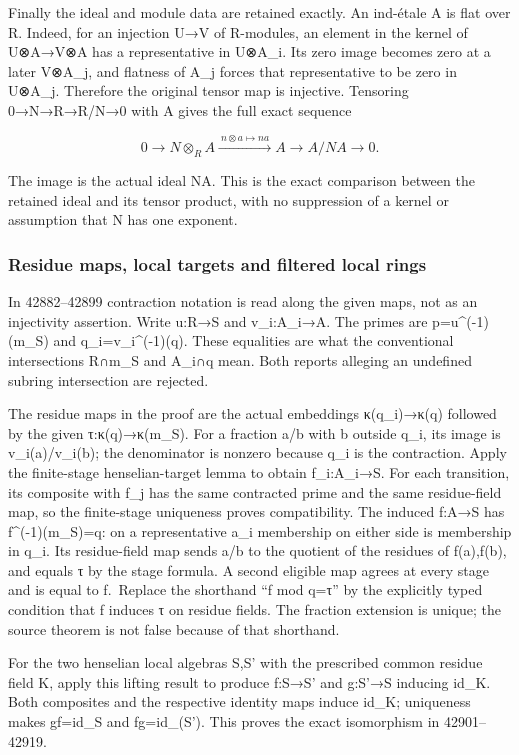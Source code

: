 Finally the ideal and module data are retained exactly. An ind-étale A is flat over R. Indeed, for an injection U→V of R-modules, an element in the kernel of U⊗A→V⊗A has a representative in U⊗A\_i. Its zero image becomes zero at a later V⊗A\_j, and flatness of A\_j forces that representative to be zero in U⊗A\_j. Therefore the original tensor map is injective. Tensoring 0→N→R→R/N→0 with A gives the full exact sequence

\[
0\longrightarrow N\otimes_R A
 \xrightarrow{\ n\otimes a\mapsto na\ } A
 \longrightarrow A/NA\longrightarrow0.
\]

The image is the actual ideal NA. This is the exact comparison between the retained ideal and its tensor product, with no suppression of a kernel or assumption that N has one exponent.

\subsubsection{Residue maps, local targets and filtered local rings}\label{algebra-proof-059-residue-maps-local-targets-and-filtered-local-rings}

In 42882--42899 contraction notation is read along the given maps, not as an injectivity assertion. Write u:R→S and v\_i:A\_i→A. The primes are p=u\^{}(-1)(m\_S) and q\_i=v\_i\^{}(-1)(q). These equalities are what the conventional intersections R∩m\_S and A\_i∩q mean. Both reports alleging an undefined subring intersection are rejected.

The residue maps in the proof are the actual embeddings κ(q\_i)→κ(q) followed by the given τ:κ(q)→κ(m\_S). For a fraction a/b with b outside q\_i, its image is v\_i(a)/v\_i(b); the denominator is nonzero because q\_i is the contraction. Apply the finite-stage henselian-target lemma to obtain f\_i:A\_i→S. For each transition, its composite with f\_j has the same contracted prime and the same residue-field map, so the finite-stage uniqueness proves compatibility. The induced f:A→S has f\^{}(-1)(m\_S)=q: on a representative a\_i membership on either side is membership in q\_i. Its residue-field map sends a/b to the quotient of the residues of f(a),f(b), and equals τ by the stage formula. A second eligible map agrees at every stage and is equal to f.~Replace the shorthand ``f mod q=τ'' by the explicitly typed condition that f induces τ on residue fields. The fraction extension is unique; the source theorem is not false because of that shorthand.

For the two henselian local algebras S,S' with the prescribed common residue field K, apply this lifting result to produce f:S→S' and g:S'→S inducing id\_K. Both composites and the respective identity maps induce id\_K; uniqueness makes gf=id\_S and fg=id\_(S'). This proves the exact isomorphism in 42901--42919.

